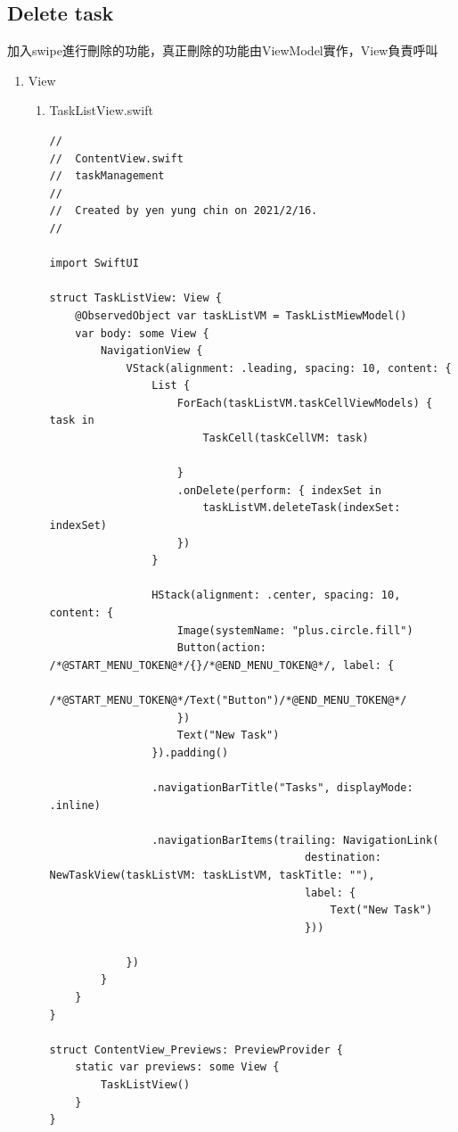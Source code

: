 \documentclass[a4paper,12pt]{article}
\begin{document}
\subsection{Delete task}
\label{sec:org774a89e}
加入swipe進行刪除的功能，真正刪除的功能由ViewModel實作，View負責呼叫\\
\begin{enumerate}
\item View
\label{sec:orga0c27a2}
\begin{enumerate}
\item TaskListView.swift
\label{sec:orgb30b82f}
\lstset{breaklines=true,language=swift,label= ,caption= ,captionpos=b,firstnumber=1,numbers=left}
\begin{lstlisting}
//
//  ContentView.swift
//  taskManagement
//
//  Created by yen yung chin on 2021/2/16.
//

import SwiftUI

struct TaskListView: View {
    @ObservedObject var taskListVM = TaskListMiewModel()
    var body: some View {
        NavigationView {
            VStack(alignment: .leading, spacing: 10, content: {
                List {
                    ForEach(taskListVM.taskCellViewModels) { task in
                        TaskCell(taskCellVM: task)

                    }
                    .onDelete(perform: { indexSet in
                        taskListVM.deleteTask(indexSet: indexSet)
                    })
                }

                HStack(alignment: .center, spacing: 10, content: {
                    Image(systemName: "plus.circle.fill")
                    Button(action: /*@START_MENU_TOKEN@*/{}/*@END_MENU_TOKEN@*/, label: {
                        /*@START_MENU_TOKEN@*/Text("Button")/*@END_MENU_TOKEN@*/
                    })
                    Text("New Task")
                }).padding()

                .navigationBarTitle("Tasks", displayMode: .inline)

                .navigationBarItems(trailing: NavigationLink(
                                        destination: NewTaskView(taskListVM: taskListVM, taskTitle: ""),
                                        label: {
                                            Text("New Task")
                                        }))

            })
        }
    }
}

struct ContentView_Previews: PreviewProvider {
    static var previews: some View {
        TaskListView()
    }
}


\end{lstlisting}
\end{enumerate}
\end{enumerate}
\end{document}
